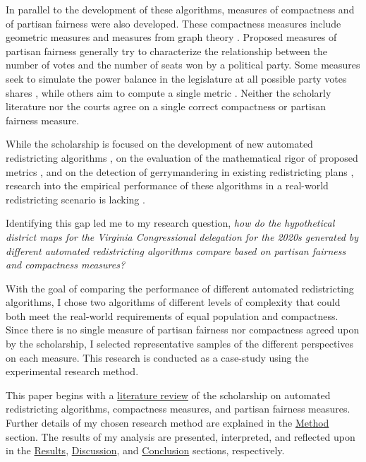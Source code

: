 In parallel to the development of these algorithms, measures of compactness and of partisan fairness were also developed. These compactness measures include geometric measures \parencite[e.g.][]{polsby1991, schwartzberg1966,harris1964, maceachren1985, reock1961, boyce1964} and measures from graph theory \parencite[e.g.][]{dube2016}. Proposed measures of partisan fairness generally try to characterize the relationship between the number of votes and the number of seats won by a political party. Some measures seek to simulate the power balance in the legislature at all possible party votes shares \parencite[e.g.][]{tufte1973}, while others aim to compute a single metric \parencite[e.g.][]{stephanopoulos2015,katz2020,warrington2018,mcdonald2015,wang2016}. Neither the scholarly literature nor the courts agree on a single correct compactness or partisan fairness measure. 

While the scholarship is focused on the development of new automated redistricting algorithms \parencite{fifield2020}, on the evaluation of the mathematical rigor of proposed metrics \parencite[see][]{katz2020}, and on the detection of gerrymandering in existing redistricting plans \parencite[e.g.][]{herschlag2017, duchin2018a}, research into the empirical performance of these algorithms in a real-world redistricting scenario is lacking \parencite{fifield2020a}.

Identifying this gap led me to my research question, \emph{how do the hypothetical district maps for the Virginia Congressional delegation for the 2020s generated by different automated redistricting algorithms compare based on partisan fairness and compactness measures?}

With the goal of comparing the performance of different automated redistricting algorithms, I chose two algorithms of different levels of complexity that could both meet the real-world requirements of equal population and compactness. Since there is no single measure of partisan fairness nor compactness agreed upon by the scholarship, I selected representative samples of the different perspectives on each measure. This research is conducted as a case-study using the experimental research method.

This paper begins with a \hyperref[sec:litreview]{literature review} of the scholarship on automated redistricting algorithms, compactness measures, and partisan fairness measures. Further details of my chosen research method are explained in the \hyperref[sec:method]{Method} section. The results of my analysis are presented, interpreted, and reflected upon in the \hyperref[sec:results]{Results}, \hyperref[sec:disc]{Discussion}, and \hyperref[sec:conc]{Conclusion} sections, respectively. 